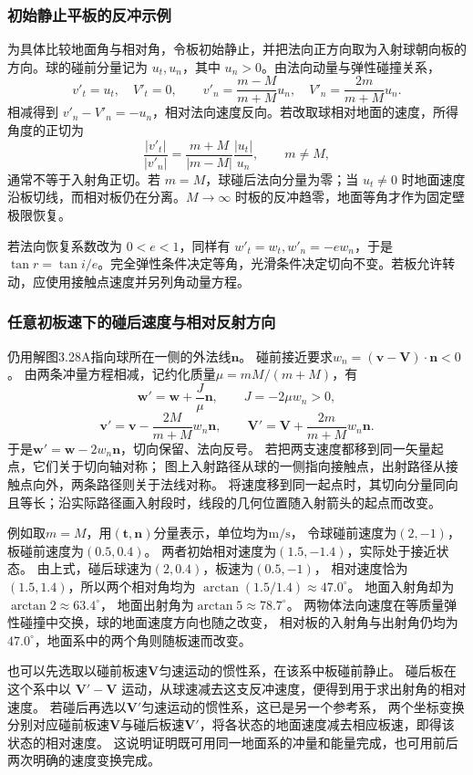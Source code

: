 \documentclass[UTF8,fontset=fandol,a4paper,11pt]{ctexart}
\newcommand{\vect}[1]{\bm{#1}}
\begin{document}
\subsubsection*{初始静止平板的反冲示例}
为具体比较地面角与相对角，令板初始静止，并把法向正方向取为入射球朝向板的方向。球的碰前分量记为 $u_t,u_n$，其中 $u_n>0$。由法向动量与弹性碰撞关系，
\[
v'_t=u_t,\quad V'_t=0,\qquad
v'_n=\frac{m-M}{m+M}u_n,\quad
V'_n=\frac{2m}{m+M}u_n.
\]
相减得到 $v'_n-V'_n=-u_n$，相对法向速度反向。若改取球相对地面的速度，所得角度的正切为
\[
\frac{|v'_t|}{|v'_n|}
=\frac{m+M}{|m-M|}\frac{|u_t|}{u_n},\qquad m\ne M,
\]
通常不等于入射角正切。若 $m=M$，球碰后法向分量为零；当 $u_t\ne0$ 时地面速度沿板切线，而相对板仍在分离。$M\to\infty$ 时板的反冲趋零，地面等角才作为固定壁极限恢复。

若法向恢复系数改为 $0<e<1$，同样有 $w'_t=w_t,w'_n=-ew_n$，于是 $\tan r=\tan i/e$。完全弹性条件决定等角，光滑条件决定切向不变。若板允许转动，应使用接触点速度并另列角动量方程。
\subsubsection*{任意初板速下的碰后速度与相对反射方向}
仍用解图3.28A指向球所在一侧的外法线$\vect n$。
碰前接近要求$w_n=(\vect v-\vect V)\cdot\vect n<0$。
由两条冲量方程相减，记约化质量$\mu=mM/(m+M)$，有
\[
\vect w'=\vect w+\frac J\mu\vect n,\qquad
J=-2\mu w_n>0,
\]
\[
\boxed{\vect v'=\vect v-\frac{2M}{m+M}w_n\vect n},\qquad
\boxed{\vect V'=\vect V+\frac{2m}{m+M}w_n\vect n}.
\]
于是$\vect w'=\vect w-2w_n\vect n$，切向保留、法向反号。
若把两支速度都移到同一矢量起点，它们关于切向轴对称；
图上入射路径从球的一侧指向接触点，出射路径从接触点向外，两条路径则关于法线对称。
将速度移到同一起点时，其切向分量同向且等长；沿实际路径画入射段时，线段的几何位置随入射箭头的起点而改变。

例如取$m=M$，用$(\vect t,\vect n)$分量表示，单位均为$\mathrm{m/s}$，
令球碰前速度为$(2,-1)$，板碰前速度为$(0.5,0.4)$。
两者初始相对速度为$(1.5,-1.4)$，实际处于接近状态。
由上式，碰后球速为$(2,0.4)$，板速为$(0.5,-1)$，
相对速度恰为$(1.5,1.4)$，所以两个相对角均为
$\arctan(1.5/1.4)\approx47.0^\circ$。
地面入射角却为$\arctan2\approx63.4^\circ$，
地面出射角为$\arctan5\approx78.7^\circ$。
两物体法向速度在等质量弹性碰撞中交换，球的地面速度方向也随之改变，
相对板的入射角与出射角仍均为$47.0^\circ$，地面系中的两个角则随板速而改变。

也可以先选取以碰前板速$\vect V$匀速运动的惯性系，在该系中板碰前静止。
碰后板在这个系中以 $\vect V'-\vect V$ 运动，从球速减去这支反冲速度，便得到用于求出射角的相对速度。
若碰后再选以$\vect V'$匀速运动的惯性系，这已是另一个参考系，
两个坐标变换分别对应碰前板速$\vect V$与碰后板速$\vect V'$，将各状态的地面速度减去相应板速，即得该状态的相对速度。
这说明证明既可用同一地面系的冲量和能量完成，也可用前后两次明确的速度变换完成。
\end{document}
